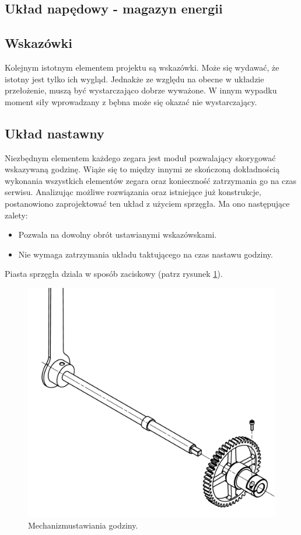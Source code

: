         \subsection{Układ napędowy - magazyn energii}
        	
        \subsection{Wskazówki}
        Kolejnym istotnym elementem projektu są wskazówki.
        Może się wydawać, że istotny jest tylko ich wygląd.
        Jednakże ze względu na obecne w układzie przełożenie, muszą być wystarczająco dobrze wyważone.
        W innym wypadku moment siły wprowadzany z bębna może się okazać nie wystarczający.
        
        \subsection{Układ nastawny}
        Niezbędnym elementem każdego zegara jest moduł pozwalający skorygować wskazywaną godzinę.
        Wiąże się to między innymi ze skończoną dokładnością wykonania wszystkich elementów zegara oraz konieczność zatrzymania go na czas serwisu.
        Analizując możliwe rozwiązania oraz istniejące już konstrukcje, postanowiono zaprojektować ten układ z użyciem sprzęgła.
        Ma ono następujące zalety:
        \begin{itemize}
        	\item Pozwala na dowolny obrót ustawianymi wskazówskami.
        	\item Nie wymaga zatrzymania układu taktującego na czas nastawu godziny.
        \end{itemize}
		Piasta sprzęgła dziala w sposób zaciskowy (patrz rysunek \ref{fig:szpeglo}).
		
		\begin{figure}
			\centering
			\includegraphics[width=0.8\linewidth]{Projekt/szpeglo}
			\caption{Mechanizmustawiania godziny.}
			\label{fig:szpeglo}
		\end{figure}
		
